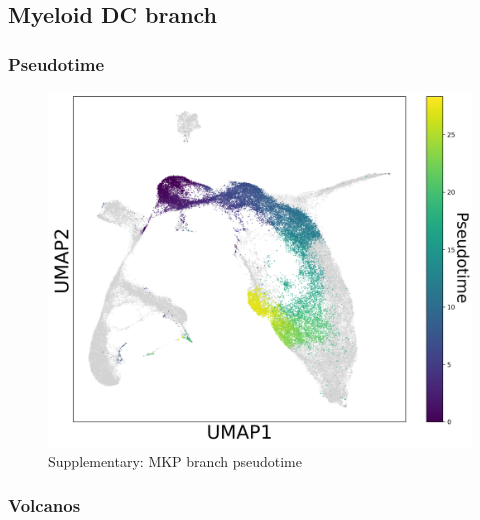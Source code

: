 \documentclass[a4paper]{article}
\begin{document}
\FloatBarrier
\subsection{Myeloid DC branch}

\subsubsection{Pseudotime}
\begin{figure}[!htb]
  \centering
  \includegraphics[width=\textwidth]{../figures/hematopoiesis/Myeloid DC_40_107_single_branch_pseudotime.png}
  \caption{Supplementary: MKP branch pseudotime}
\end{figure}

\FloatBarrier
\subsubsection{Volcanos}
\end{document}
